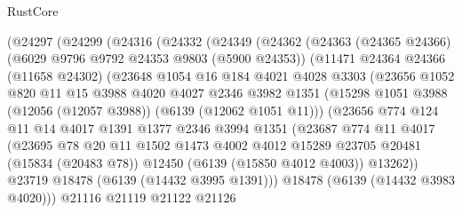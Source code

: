 \begin{lexlean}{RustCore}
\begin{coremodule}
        (@24297
          (@24299
            (@24316
              (@24332
                (@24349
                  (@24362
                    (@24363
                      (@24365 @24366)
                      (@6029 @9796 @9792 @24353 @9803 (@5900 @24353))
                      (@11471
                        @24364
                        @24366
                        (@11658 @24302)
                        (@23648
                          @1054
                          @16
                          @184
                          @4021
                          @4028
                          @3303
                          (@23656
                            @1052
                            @820
                            @11
                            @15
                            @3988
                            @4020
                            @4027
                            @2346
                            @3982
                            @1351
                            (@15298 @1051 @3988 (@12056 (@12057 @3988)) (@6139 (@12062 @1051 @11)))
                            (@23656
                              @774
                              @124
                              @11
                              @14
                              @4017
                              @1391
                              @1377
                              @2346
                              @3994
                              @1351
                              (@23687
                                @774
                                @11
                                @4017
                                (@23695
                                  @78
                                  @20
                                  @11
                                  @1502
                                  @1473
                                  @4002
                                  @4012
                                  @15289
                                  @23705
                                  @20481
                                  (@15834 (@20483 @78))
                                  @12450
                                  (@6139 (@15850 @4012 @4003))
                                  @13262))
                              @23719
                              @18478
                              (@6139 (@14432 @3995 @1391)))
                            @18478
                            (@6139 (@14432 @3983 @4020)))
                          @21116
                          @21119
                          @21122
                          @21126

\end{coremodule}
\end{lexlean}
